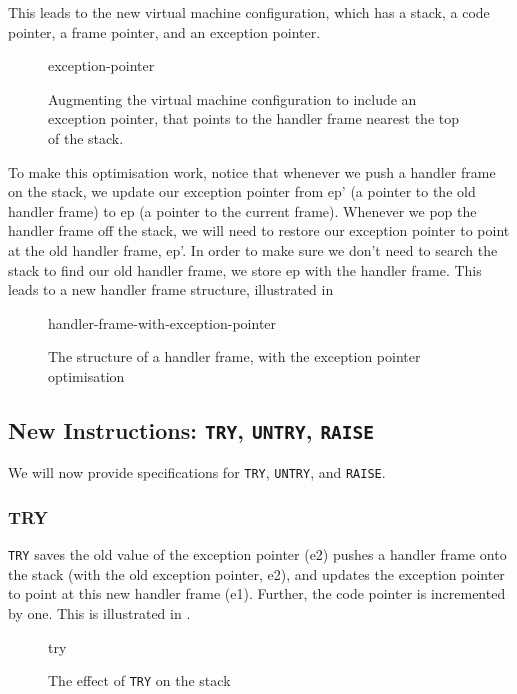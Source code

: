 This leads to the new virtual machine configuration, which has a stack, a code pointer, a frame pointer, and an exception pointer. 

\begin{figure}[H]
    \centering
    {exception-pointer}
    \caption{Augmenting the virtual machine configuration to include an exception pointer, that points to the handler frame nearest the top of the stack.}
    \label{fig:exception-pointer}
\end{figure}

To make this optimisation work, notice that whenever we push a handler frame on the stack, we update our exception pointer from ep' (a pointer to the old handler frame) to ep (a pointer to the current frame). Whenever we pop the handler frame off the stack, we will need to restore our exception pointer to point at the old handler frame, ep'. In order to make sure we don't need to search the stack to find our old handler frame, we store ep with the handler frame. This leads to a new handler frame structure, illustrated in 

\begin{figure}[H]
    \centering
    {handler-frame-with-exception-pointer}
    \caption{The structure of a handler frame, with the exception pointer optimisation}
    \label{fig:handler-frame-with-exception-pointer}
\end{figure}

\subsection{New Instructions: \texttt{TRY}, \texttt{UNTRY}, \texttt{RAISE}}
We will now provide specifications for \texttt{TRY}, \texttt{UNTRY}, and \texttt{RAISE}. 

\subsubsection{TRY}
\texttt{TRY} saves the old value of the exception pointer (e2) pushes a handler frame onto the stack (with the old exception pointer, e2), and updates the exception pointer to point at this new handler frame (e1). Further, the code pointer is incremented by one. This is illustrated in .

\begin{figure}[H]
    \centering
    {try}
    \caption{The effect of \texttt{TRY} on the stack}
    \label{fig:try-specification}
\end{figure}

